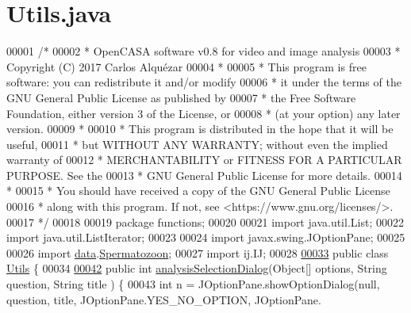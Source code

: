 \hypertarget{_utils_8java_source}{}\section{Utils.\+java}
\label{_utils_8java_source}

\begin{DoxyCode}
00001 \textcolor{comment}{/*}
00002 \textcolor{comment}{ *   OpenCASA software v0.8 for video and image analysis}
00003 \textcolor{comment}{ *   Copyright (C) 2017  Carlos Alquézar}
00004 \textcolor{comment}{ *}
00005 \textcolor{comment}{ *   This program is free software: you can redistribute it and/or modify}
00006 \textcolor{comment}{ *   it under the terms of the GNU General Public License as published by}
00007 \textcolor{comment}{ *   the Free Software Foundation, either version 3 of the License, or}
00008 \textcolor{comment}{ *   (at your option) any later version.}
00009 \textcolor{comment}{ *}
00010 \textcolor{comment}{ *   This program is distributed in the hope that it will be useful,}
00011 \textcolor{comment}{ *   but WITHOUT ANY WARRANTY; without even the implied warranty of}
00012 \textcolor{comment}{ *   MERCHANTABILITY or FITNESS FOR A PARTICULAR PURPOSE.  See the}
00013 \textcolor{comment}{ *   GNU General Public License for more details.}
00014 \textcolor{comment}{ *}
00015 \textcolor{comment}{ *   You should have received a copy of the GNU General Public License}
00016 \textcolor{comment}{ *   along with this program.  If not, see <https://www.gnu.org/licenses/>.}
00017 \textcolor{comment}{*/}    
00018 
00019 \textcolor{keyword}{package }functions;
00020 
00021 \textcolor{keyword}{import} java.util.List;
00022 \textcolor{keyword}{import} java.util.ListIterator;
00023 
00024 \textcolor{keyword}{import} javax.swing.JOptionPane;
00025 
00026 \textcolor{keyword}{import} \hyperlink{namespacedata}{data}.\hyperlink{classdata_1_1_spermatozoon}{Spermatozoon};
00027 \textcolor{keyword}{import} ij.IJ;
00028 
\hypertarget{_utils_8java_source_l00033}{}\hyperlink{classfunctions_1_1_utils}{00033} \textcolor{keyword}{public} \textcolor{keyword}{class }\hyperlink{classfunctions_1_1_utils}{Utils} \{
00034 
\hypertarget{_utils_8java_source_l00042}{}\hyperlink{classfunctions_1_1_utils_a0e53c856e8bb35342f949c2f320d0e74}{00042}   \textcolor{keyword}{public} \textcolor{keywordtype}{int} \hyperlink{classfunctions_1_1_utils_a0e53c856e8bb35342f949c2f320d0e74}{analysisSelectionDialog}(Object[] options, String question, String title
      ) \{
00043     \textcolor{keywordtype}{int} n = JOptionPane.showOptionDialog(null, question, title, JOptionPane.YES\_NO\_OPTION, JOptionPane.

\end{DoxyCode}

